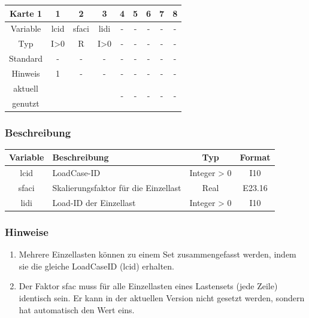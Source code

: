 \documentclass[11pt,titlepage,listof=totoc,bibliography=totoc,twoside]{scrreprt}
\begin{document}
{{\begin{table}[htbp]
\centering
\begin{tabularx}{\textwidth}{cCCCCCCCC}
\toprule
Karte 1	& 1		& 2		& 3		& 4		& 5		& 6		& 7		& 8		\\
\midrule
Variable& lcid		& sfaci		& lidi		& -		& -		& -		& -		& -		\\
Typ	& I>0		& R		& I>0		& -		& -		& -		& -		& -		\\
Standard& -		& -		& -		& -		& -		& -		& -		& -		\\
Hinweis	& 1		& -		& -		& -		& -		& -		& -		& -		\\
aktuell	& 	& 	& 	& 	& 	& \multirow{2}{*}{-}	& 	& 	\\
genutzt \\
\bottomrule
\end{tabularx}
\end{table}

\subsubsection{Beschreibung}

\begin{tabularx}{\textwidth}{cXcc}
\toprule
Variable& Beschreibung					& Typ		& Format\\
\midrule
lcid	& LoadCase-ID					& Integer > 0	& I10	\\
sfaci	& Skalierungsfaktor für die  Einzellast		& Real		& E23.16\\
lidi	& Load-ID der Einzellast			& Integer > 0	& I10	\\
\bottomrule
\end{tabularx}

\subsubsection{Hinweise}

\begin{enumerate}
\item Mehrere Einzellasten können zu einem Set zusammengefasst werden, indem sie die gleiche LoadCaseID (lcid) erhalten.
\item Der Faktor sfac muss für alle Einzellasten eines Lastensets (jede Zeile) identisch sein. Er kann in der aktuellen Version nicht gesetzt werden, sondern hat automatisch den Wert eins.
\end{enumerate}

}}
\end{document}
